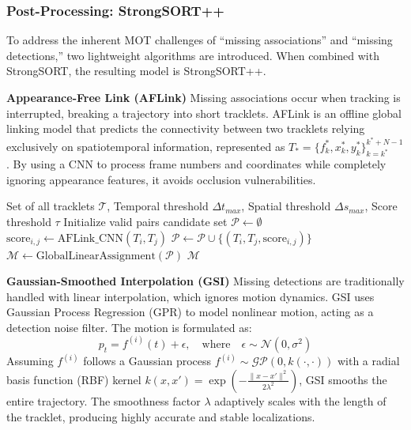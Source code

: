 \documentclass[10pt,twocolumn,letterpaper]{article}
\begin{document}
\subsubsection{Post-Processing: StrongSORT++}
To address the inherent MOT challenges of ``missing associations'' and ``missing detections,'' two lightweight algorithms are introduced. When combined with StrongSORT, the resulting model is StrongSORT++.

\noindent\textbf{Appearance-Free Link (AFLink)}
Missing associations occur when tracking is interrupted, breaking a trajectory into short tracklets. AFLink is an offline global linking model that predicts the connectivity between two tracklets relying exclusively on spatiotemporal information, represented as $T_* = \{f_k^*, x_k^*, y_k^*\}_{k=k^*}^{k^*+N-1}$. By using a CNN to process frame numbers and coordinates while completely ignoring appearance features, it avoids occlusion vulnerabilities.

\begin{algorithm}[H]
\caption{AFLink Global Association Strategy}
\begin{algorithmic}[1]
\Require Set of all tracklets $\mathcal{T}$, Temporal threshold $\Delta t_{max}$, Spatial threshold $\Delta s_{max}$, Score threshold $\tau$
\State Initialize valid pairs candidate set $\mathcal{P} \gets \emptyset$
        \State $\text{score}_{i,j} \gets \text{AFLink\_CNN}(T_i, T_j)$
            \State $\mathcal{P} \gets \mathcal{P} \cup \{(T_i, T_j, \text{score}_{i,j})\}$
        \EndIf
    \EndIf
\EndFor
\State $\mathcal{M} \gets \text{GlobalLinearAssignment}(\mathcal{P})$ 
\State \Return $\mathcal{M}$
\end{algorithmic}
\end{algorithm}

\noindent\textbf{Gaussian-Smoothed Interpolation (GSI)}
Missing detections are traditionally handled with linear interpolation, which ignores motion dynamics. GSI uses Gaussian Process Regression (GPR) to model nonlinear motion, acting as a detection noise filter. The motion is formulated as:
\begin{equation}
    p_t = f^{(i)}(t) + \epsilon, \quad \text{where} \quad \epsilon \sim \mathcal{N}(0, \sigma^2)
\end{equation}
Assuming $f^{(i)}$ follows a Gaussian process $f^{(i)} \sim \mathcal{GP}(0, k(\cdot, \cdot))$ with a radial basis function (RBF) kernel $k(x, x') = \exp(-\frac{\|x-x'\|^2}{2\lambda^2})$, GSI smooths the entire trajectory. The smoothness factor $\lambda$ adaptively scales with the length of the tracklet, producing highly accurate and stable localizations.
\end{document}
